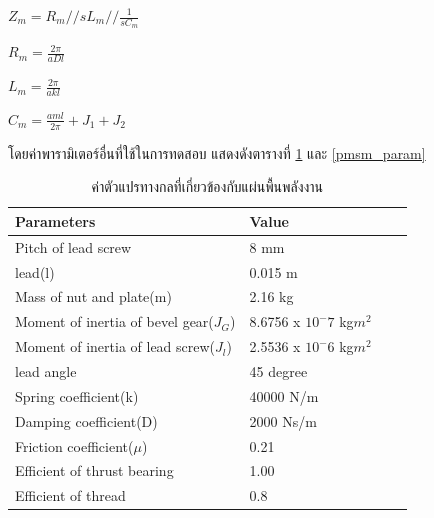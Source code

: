 \documentclass[11pt,a4paper]{article}
\begin{document}
$Z_{m} = R_{m}//sL_{m}// \frac{1}{sC_{m}} $

$R_{m} = \frac{2\pi}{aDl}$

$L_{m} = \frac{2\pi}{akl}$

$C_{m} = \frac{aml}{2\pi} + J_{1} + J_{2}$

โดยค่าพารามิเตอร์อื่นที่ใช้ในการทดสอบ \cite{GpH:01} แสดงดังตารางที่ \ref{mech_param} และ \ref{pmsm_param}
\begin{table}[H]
    \centering
    \begin{tabular}{ | l | l | l | p{5cm} |}
        \hline
        \textbf{Parameters}                      & \textbf{Value}           \\ \hline
        Pitch of lead screw                      & 8 mm                     \\ \hline
        lead(l)                                  & 0.015 m                  \\ \hline
        Mass of nut and plate(m)                 & 2.16 kg                  \\ \hline
        Moment of inertia of bevel gear($J_{G}$) & 8.6756 x $10^-7$ kg$m^2$ \\ \hline
        Moment of inertia of lead screw($J_{l}$) & 2.5536 x $10^-6$ kg$m^2$ \\ \hline
        lead angle                               & 45 degree                \\ \hline
        Spring coefficient(k)                    & 40000 N/m                \\ \hline
        Damping coefficient(D)                   & 2000 Ns/m                \\ \hline
        Friction coefficient($\mu$)              & 0.21                     \\ \hline
        Efficient of thrust bearing              & 1.00                     \\ \hline
        Efficient of thread                      & 0.8                      \\ \hline
    \end{tabular}
    \caption{ค่าตัวแปรทางกลที่เกี่ยวข้องกับแผ่นพื้นพลังงาน \cite{GpH:01}}
    \label{mech_param}
\end{table}
\end{document}
